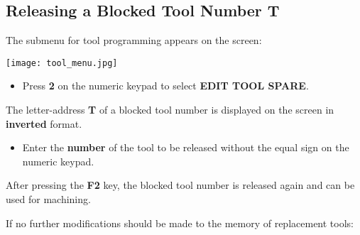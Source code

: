 \newpage

\subsection{Releasing a Blocked Tool Number \textbf{T}}

\begin{itemize}
    \vspace{.6cm}
    \vspace{.6cm}
\end{itemize}

\vspace{.5cm}

The submenu for tool programming appears on the screen:

\begin{center}
    \texttt{[image: tool\_menu.jpg]}
\end{center}

\begin{itemize}
    \item Press \textbf{2} on the numeric keypad to select \textbf{EDIT TOOL SPARE}.
\end{itemize}

The letter-address \textbf{T} of a blocked tool number is displayed on the screen in \textbf{inverted} format.

\begin{itemize}
    \item Enter the \textbf{number} of the tool to be released without the equal sign on the numeric keypad.
    \vspace{.6cm}
\end{itemize}

After pressing the \textbf{F2} key, the blocked tool number is released again and can be used for machining.

If no further modifications should be made to the memory of replacement tools:

\begin{itemize}
\end{itemize}
\vspace{.5cm}
\notes

